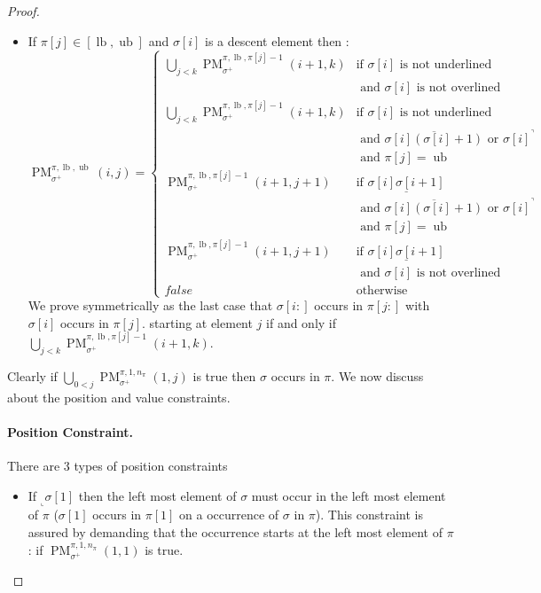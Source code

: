 \documentclass[a4paper]{llncs}
\newcommand{\ptext}{\pi}
\newcommand{\pmotif}{\sigma}
\newcommand{\pbmotif}{\pmotif^+}
\DeclareMathOperator{\PMa}{PM}
\newcommand{\PM}[6]{\PMa_{{#1}}^{{#2},{#3},{#4}}({#5},{#6})}
\DeclareMathOperator{\lb}{lb}
\DeclareMathOperator{\ub}{ub}
\begin{document}
\begin{proof}
\begin{itemize}
	\item If $\ptext[j] \in [\lb,\ub]$ and $\pmotif[i]$ is a descent element then :
	$$
	\PM{\pbmotif}{\ptext}{\lb}{\ub}{i}{j}=
	\begin{cases}
			\bigcup_{j<k} \PM{\pbmotif}{\ptext}{\lb}{\ptext[j]-1}{i+1}{k}
				& \text{if $\pmotif[i]$ is not underlined } \\
				& \text{ and $\pmotif[i]$ is not overlined} \\ 
			\bigcup_{j<k} \PM{\pbmotif}{\ptext}{\lb}{\ptext[j]-1}{i+1}{k}
				& \text{if $\pmotif[i]$ is not underlined } \\
				& \text{ and $\overline{\pmotif[i](\pmotif[i]+1)}$ or ${\pmotif[i]}^\urcorner$}\\ 	
				& \text{ and $\ptext[j]=\ub$} \\
			\PM{\pbmotif}{\ptext}{\lb}{\ptext[j]-1}{i+1}{j+1}	
				& \text{if $\underline{\pmotif[i]\pmotif[i+1]}$ } \\
				& \text{ and $\overline{\pmotif[i](\pmotif[i]+1)}$ or ${\pmotif[i]}^\urcorner$}\\ 	
				& \text{ and $\ptext[j]=\ub$} \\					
			\PM{\pbmotif}{\ptext}{\lb}{\ptext[j]-1}{i+1}{j+1}	
				& \text{if $\underline{\pmotif[i]\pmotif[i+1]}$ } \\
				& \text{ and $\pmotif[i]$ is not overlined} \\	
			false & \text{otherwise}		
	\end{cases}
	$$	
	We prove symmetrically as the last case that 
	$\pmotif[i:]$ occurs in $\ptext[j:]$
	with $\sigma[i]$ occurs in $\pi[j]$.
	 starting at element $j$ if and only if $\bigcup_{j<k} \PM{\pbmotif}{\ptext}{\lb}{\ptext[j]-1}{i+1}{k}$. 

\end{itemize}

Clearly if $\bigcup_{0<j} \PM{\pbmotif}{\ptext}{1}{n_\ptext}{1}{j}$ is true then $\sigma$ occurs in $\pi$. We now discuss about the position and value constraints.
\paragraph{Position Constraint.} There are 3 types of position constraints 
\begin{itemize}
	\item If $_\llcorner{\sigma[1]}$ then the left most element of $\sigma$  must occur in the left most element of $\pi$ ($\pmotif[1]$ occurs in $\ptext[1]$ on a occurrence of $\pmotif$ in $\ptext$). This constraint is assured by demanding that the occurrence starts at the left most element of $\ptext$ : if  $\PM{\pbmotif}{\ptext}{1}{n_\ptext}{1}{1}$ is true.
	

\end{itemize}
\end{proof}
\end{document}

